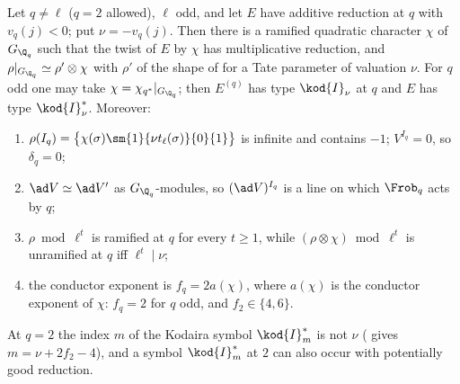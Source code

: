 \begin{proposition}\label{prop:galrep:potmult}
Let $q\ne\ell$ ($q=2$ allowed), $\ell$ odd, and let $E$ have additive reduction at $q$ with $v_q(j)<0$; put $\nu=-v_q(j)$. Then there is a ramified
quadratic character $\chi$ of $G_{\Q_q}$ such that the twist of $E$ by $\chi$ has multiplicative reduction, and $\rho|_{G_{\Q_q}}\simeq\rho'\otimes\chi$ with
$\rho'$ of the shape of  for a Tate parameter of valuation $\nu$. For $q$ odd one may take $\chi=\chi_{q^*}|_{G_{\Q_q}}$; then
$E^{(q)}$ has type $\kod{I}_\nu$ at $q$ and $E$ has type $\kod{I}_\nu^*$. Moreover:
\begin{enumerate}[label=(\roman*)]
\item $\rho(I_q)=\bigl\{\chi(\sigma)\sm{1}{\nu t_\ell(\sigma)}{0}{1}\bigr\}$ is infinite and contains $-1$; $V^{I_q}=0$, so $\delta_q=0$;
\item $\ad V\simeq\ad V'$ as $G_{\Q_q}$-modules, so $(\ad V)^{I_q}$ is a line on which $\Frob_q$ acts by $q$;
\item $\rho\bmod\ell^t$ is ramified at $q$ for every $t\ge1$, while $(\rho\otimes\chi)\bmod\ell^t$ is unramified at $q$ iff $\ell^t\mid\nu$;
\item the conductor exponent is $f_q=2a(\chi)$, where $a(\chi)$ is the conductor exponent of $\chi$: $f_q=2$ for $q$ odd, and $f_2\in\{4,6\}$.
\end{enumerate}
At $q=2$ the index $m$ of the Kodaira symbol $\kod{I}_m^*$ is not $\nu$ ( gives $m=\nu+2f_2-4$), and a symbol $\kod{I}_m^*$ at $2$ can also
occur with potentially good reduction.
\end{proposition}

